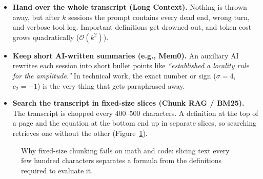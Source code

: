 \documentclass[11pt,a4paper]{article}
\begin{document}
\begin{itemize}[itemsep=2pt,leftmargin=1.5em]
  \item \textbf{Hand over the whole transcript (Long Context).} Nothing is thrown away, but after $k$ sessions the prompt contains every dead end, wrong turn, and verbose tool log. Important definitions get drowned out, and token cost grows quadratically ($\mathcal{O}(k^2)$).
  \item \textbf{Keep short AI-written summaries (e.g., Mem0).} An auxiliary AI rewrites each session into short bullet points like \emph{``established a locality rule for the amplitude.''} In technical work, the exact number or sign ($\sigma = 4$, $c_2 = -1$) is the very thing that gets paraphrased away.
  \item \textbf{Search the transcript in fixed-size slices (Chunk RAG / BM25).} The transcript is chopped every 400--500 characters. A definition at the top of a page and the equation at the bottom end up in separate slices, so searching retrieves one without the other (Figure~\ref{fig:problem}).
\end{itemize}

\begin{figure}[H]
\centering
{}
\caption{Why fixed-size chunking fails on math and code: slicing text every few hundred characters separates a formula from the definitions required to evaluate it.}
\label{fig:problem}
\end{figure}
\end{document}
